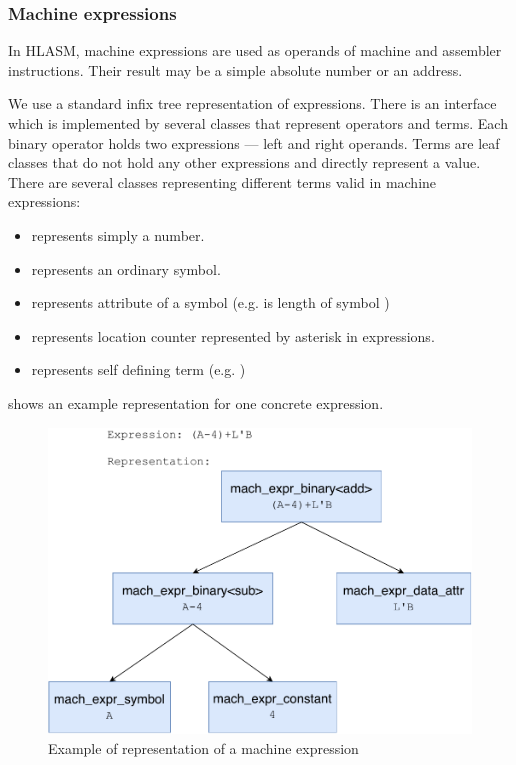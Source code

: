 \subsubsection{Machine expressions}
\label{mach_expr}

In HLASM, machine expressions are used as operands of machine and assembler instructions. Their result may be a simple absolute number or an address.

We use a standard infix tree representation of expressions. There is an interface  which is implemented by several classes that represent operators and terms. Each binary operator holds two expressions --- left and right operands. Terms are leaf classes that do not hold any other expressions and directly represent a value. There are several classes representing different terms valid in machine expressions:
\begin{itemize}
	\item {} represents simply a number.
	\item {} represents an ordinary symbol.
	\item {} represents attribute of a symbol (e.g.  is length of symbol )
	\item {} represents location counter represented by asterisk in expressions. 
	\item {} represents self defining term (e.g. )
\end{itemize}
 shows an example representation for one concrete expression.

\begin{figure}
	\centering
	\includegraphics[width=13cm]{img/mach_expr_example}
	\caption{Example of representation of a machine expression}
	\label{mach_expr_example}
\end{figure}

